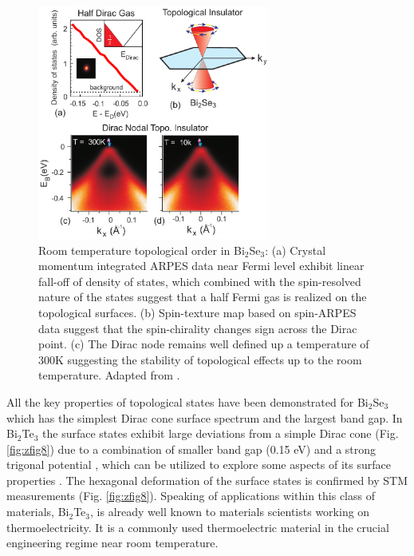 \documentclass[twocolumn,floatfix,showpacs,rmp,aps]{revtex4}
\begin{document}
	\begin{figure}
		\includegraphics[width=3in]{Fig13}
		\caption{ Room temperature topological
			order in Bi$_2$Se$_3$:  (a) Crystal momentum
			integrated ARPES data near Fermi level exhibit linear fall-off of
			density of states, which combined with the spin-resolved nature of
			the states suggest that a half Fermi gas is realized on the
			topological surfaces. (b) Spin-texture map based on spin-ARPES data
			suggest that the spin-chirality changes sign across the Dirac point.
			(c) The Dirac node remains well
			defined up a temperature of 300K suggesting the stability of
			topological effects up to the room temperature.  Adapted from .}
		\label{fig:zfig7}
	\end{figure}
	
	All the key properties of
	topological states have been demonstrated for Bi$_2$Se$_3$ which has
	the simplest Dirac cone surface spectrum and the largest band gap.
	In Bi$_2$Te$_3$ the surface states exhibit large deviations
	from a simple Dirac cone (Fig. \ref{fig:zfig8}) due to a combination of smaller
	band gap (0.15 eV) and a strong trigonal potential \cite{chen09},
	which can be utilized to explore some aspects
	of its surface properties \cite{fu09,hasan09}.
	The hexagonal deformation of the surface states is confirmed by STM
	measurements \cite{alpichshev10} (Fig. \ref{fig:zfig8}).
	Speaking of applications within this class of
	materials, Bi$_2$Te$_3$, is already well known to materials
	scientists working on thermoelectricity.  It is a commonly used
	thermoelectric material in the crucial engineering regime near room
	temperature.
	
\end{document}
